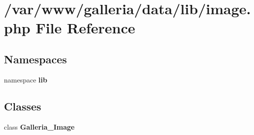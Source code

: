 \section{/var/www/galleria/data/lib/image.php File Reference}
\label{image_8php}
\subsection*{Namespaces}
\begin{CompactItemize}
\item 
namespace {\bf lib}
\end{CompactItemize}
\subsection*{Classes}
\begin{CompactItemize}
\item 
class {\bf Galleria\_\-Image}
\end{CompactItemize}
